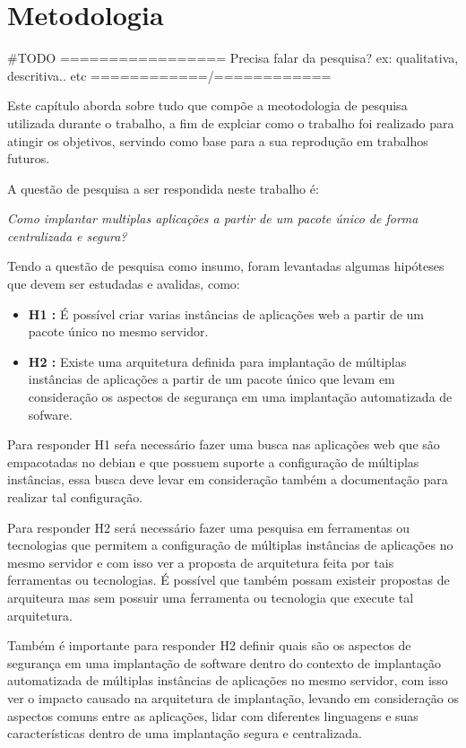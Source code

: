 \chapter{Metodologia}
\label{cap-metodologia}


#TODO
================= Precisa falar da pesquisa? ex: qualitativa, descritiva.. etc ============/============

Este capítulo aborda sobre tudo que compõe a meotodologia de pesquisa utilizada
durante o trabalho, a fim de explciar como o trabalho foi realizado para atingir os
objetivos, servindo como base para a sua reprodução em trabalhos futuros.

A questão de pesquisa a ser respondida neste trabalho é:

\begin{center}
  \textit{
    Como implantar multiplas aplicações a partir de um pacote único
    de forma centralizada e segura?
}
\end{center}

Tendo a questão de pesquisa como insumo, foram levantadas algumas hipóteses que devem
ser estudadas e avalidas, como:

\begin{itemize}
  \item  \textbf{H1 :} É possível criar varias instâncias de aplicações
  web a partir de um pacote único no mesmo servidor.
   \item  \textbf{H2 :} Existe uma arquitetura definida para implantação de
   múltiplas instâncias de aplicações a partir de um pacote único que levam em consideração
   os aspectos de segurança em uma implantação automatizada de sofware.
\end{itemize}

Para responder H1 seŕa necessário fazer uma busca nas aplicações web que são
empacotadas no debian e que possuem suporte a configuração de múltiplas instâncias,
essa busca deve levar em consideração também a documentação para realizar tal
configuração.

Para responder H2 será necessário fazer uma pesquisa em ferramentas ou tecnologias que
permitem a configuração de múltiplas instâncias de aplicações no mesmo servidor e com
isso ver a proposta de arquitetura feita por tais ferramentas ou tecnologias. É
possível que também possam existeir propostas de arquiteura mas sem possuir uma
ferramenta ou tecnologia que execute tal arquitetura.

Também é importante para responder H2 definir quais são os aspectos de segurança em
uma implantação de software dentro do contexto de implantação automatizada de múltiplas instâncias de aplicações no mesmo servidor,
com isso ver o impacto causado na arquitetura de implantação, levando em consideração os
aspectos comuns entre as aplicações, lidar com diferentes linguagens e suas características
dentro de uma implantação segura e centralizada.

